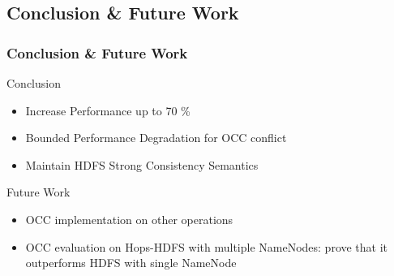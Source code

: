 \documentclass{beamer}
\begin{document}
\subsection{Conclusion \& Future Work}
\begin{frame}
	\frametitle{Conclusion \& Future Work}
	\begin{block}{Conclusion}
		\begin{itemize}
			\item Increase Performance up to 70 \%
			\item Bounded Performance Degradation for OCC conflict
			\item Maintain HDFS Strong Consistency Semantics
		\end{itemize}
	\end{block}
	\begin{block}{Future Work}
				\begin{itemize}
					\item OCC implementation on other operations
					\item OCC evaluation on Hops-HDFS with  multiple NameNodes: prove that it outperforms HDFS with single NameNode
				\end{itemize}
	\end{block}
\end{frame}
\end{document}
